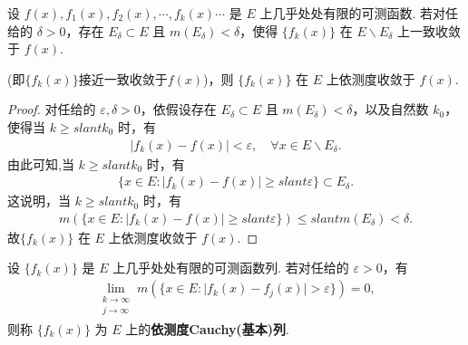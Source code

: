 \documentclass[../../main.tex]{subfiles}
\begin{document}
\begin{theorem}\label{theorem:定理3.15}
设 $f(x),f_1(x),f_2(x),\cdots,f_k(x)\cdots$ 是 $E$ 上几乎处处有限的可测函数. 若对任给的 $\delta>0$，存在 $E_\delta\subset E$ 且 $m(E_\delta)<\delta$，使得 $\{f_k(x)\}$ 在 $E\backslash E_\delta$ 上一致收敛于 $f(x)$.

(即$\{f_k(x)\}$接近一致收敛于$f(x)$)，则 $\{f_k(x)\}$ 在 $E$ 上依测度收敛于 $f(x)$.
\end{theorem}
\begin{proof}
对任给的 $\varepsilon,\delta>0$，依假设存在 $E_\delta\subset E$ 且 $m(E_\delta)<\delta$，以及自然数 $k_0$，使得当 $k\geqslant slant k_0$ 时，有
\begin{align*}
\vert f_k(x)-f(x)\vert<\varepsilon,\quad \forall x\in E\backslash E_\delta.
\end{align*}
由此可知,当 $k\geqslant slant k_0$ 时，有
\begin{align*}
\{x\in E:\vert f_k(x)-f(x)\vert\geqslant slant\varepsilon\}\subset E_\delta.
\end{align*}
这说明，当 $k\geqslant slant k_0$ 时，有
\begin{align*}
m(\{x\in E:\vert f_k(x)-f(x)\vert\geqslant slant\varepsilon\})\leqslant slant m(E_\delta)<\delta.
\end{align*}
故$\{f_k(x)\}$ 在 $E$ 上依测度收敛于 $f(x)$.
\end{proof}

\begin{definition}[依测度Cauchy(基本)列]
设 $\{f_k(x)\}$ 是 $E$ 上几乎处处有限的可测函数列. 若对任给的 $\varepsilon>0$，有
\begin{align*}
\lim_{\substack{k\to\infty\\j\to\infty}}m(\{x\in E:\vert f_k(x)-f_j(x)\vert>\varepsilon\}) = 0,
\end{align*}
则称 $\{f_k(x)\}$ 为 $E$ 上的\textbf{依测度Cauchy(基本)列}.
\end{definition}
\end{document}
